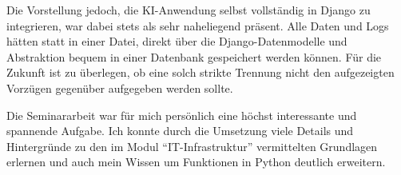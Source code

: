 \documentclass[12pt,oneside,titlepage,listof=totoc,bibliography=totoc]{scrartcl}
\begin{document}
Die Vorstellung jedoch, die KI-Anwendung selbst vollständig in Django zu integrieren, war dabei stets als sehr naheliegend präsent. Alle Daten und Logs hätten statt in einer Datei, direkt über die Django-Datenmodelle und Abstraktion bequem in einer Datenbank gespeichert werden können.  Für die Zukunft ist zu überlegen, ob eine solch strikte Trennung nicht den aufgezeigten Vorzügen gegenüber aufgegeben werden sollte. 

Die Seminararbeit war für mich persönlich eine höchst interessante und  spannende Aufgabe. Ich konnte durch die Umsetzung viele Details und Hintergründe zu den im Modul \enquote{IT-Infrastruktur} vermittelten Grundlagen erlernen und auch mein Wissen um Funktionen in Python deutlich erweitern. 

\newpage
\section*{\AppendixName} %
\end{document}
